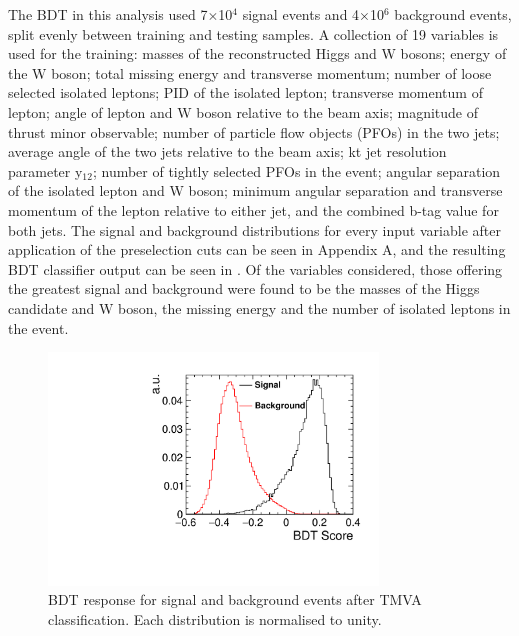 The \ac{BDT} in this analysis used 7$\times$10$^4$ signal events and 4$\times$10$^6$ background events, split evenly between training and testing samples. A collection of 19 variables is used for the training: masses of the reconstructed Higgs and W bosons; energy of the W boson; total missing energy and transverse momentum; number of loose selected isolated leptons; PID of the isolated lepton; transverse momentum of lepton; angle of lepton and W boson relative to the beam axis; magnitude of thrust minor observable; number of particle flow objects (PFOs) in the two jets; average angle of the two jets relative to the beam axis; kt jet resolution parameter y$_{12}$; number of tightly selected PFOs in the event; angular separation of the isolated lepton and W boson;  minimum angular separation and transverse momentum of the lepton relative to either jet, and the combined b-tag value for both jets. The signal and background distributions for every input variable after application of the preselection cuts can be seen in Appendix A, and the resulting BDT classifier output can be seen in . Of the variables considered, those offering the greatest signal and background were found to be the masses of the Higgs candidate and W boson, the missing energy and the number of isolated leptons in the event.

\begin{figure}
  \centering
  \includegraphics[width=0.78\textwidth,keepaspectratio]{HiggsAnalysis/figures/bdtscore}
  \caption[Classifier BDT response]{BDT response for signal and background events after TMVA classification. Each distribution is normalised to unity.}
  \label{bdt}
\end{figure}

